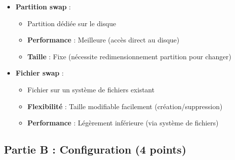 \documentclass[12pt,a4paper]{article}
\begin{document}
\begin{answerbox}
\begin{itemize}
    \item \textbf{Partition swap} :
    \begin{itemize}
        \item Partition dédiée sur le disque
        \item \textbf{Performance} : Meilleure (accès direct au disque)
        \item \textbf{Taille} : Fixe (nécessite redimensionnement partition pour changer)
    \end{itemize}
    \item \textbf{Fichier swap} :
    \begin{itemize}
        \item Fichier sur un système de fichiers existant
        \item \textbf{Flexibilité} : Taille modifiable facilement (création/suppression)
        \item \textbf{Performance} : Légèrement inférieure (via système de fichiers)
    \end{itemize}
\end{itemize}
\end{answerbox}

\subsection*{Partie B : Configuration (4 points)}
\end{document}
